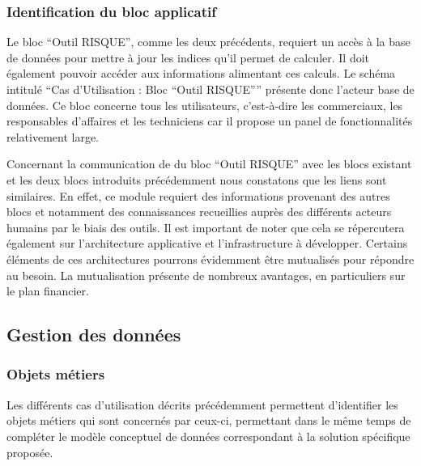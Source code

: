 \subsubsection{Identification du bloc applicatif}

Le bloc “Outil RISQUE”, comme les deux précédents, requiert un accès à la base de données pour mettre à jour les indices qu’il permet de calculer. Il doit également pouvoir accéder aux informations alimentant ces calculs. Le schéma intitulé “Cas d’Utilisation : Bloc “Outil RISQUE”” présente donc l’acteur base de données. Ce bloc concerne tous les utilisateurs, c’est-à-dire les commerciaux, les responsables d’affaires et les techniciens car il propose un panel de fonctionnalités relativement large.


Concernant la communication de du bloc “Outil RISQUE” avec les blocs existant et les deux blocs introduits précédemment nous constatons que les liens sont similaires. En effet, ce module requiert des informations provenant des autres blocs et notamment des connaissances recueillies auprès des différents acteurs humains par le biais des outils. Il est important de noter que cela se répercutera également sur l’architecture applicative et l’infrastructure à développer. Certains éléments de ces architectures pourrons évidemment être mutualisés pour répondre au besoin. La mutualisation présente de nombreux avantages, en particuliers sur le plan financier.


\subsection{Gestion des données}

\subsubsection{Objets métiers}

Les différents cas d’utilisation décrits précédemment permettent d’identifier les objets métiers qui sont concernés par ceux-ci, permettant dans le même temps de compléter le modèle conceptuel de données correspondant à la solution spécifique proposée.


